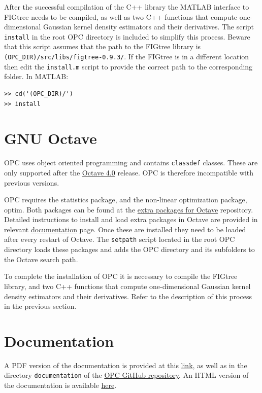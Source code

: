 \documentclass{book}
\begin{document}
After the successful compilation of the C++ library the MATLAB interface to
FIGtree needs to be compiled, as well as two C++ functions that compute
one-dimensional Gaussian kernel density estimators and their derivatives.
%
The script {\tt install} in the root OPC directory is included to simplify this process.
Beware that this script assumes that the path to the FIGtree library is
{\tt (OPC\_DIR)/src/libs/figtree-0.9.3/}. If the FIGtree is in a different location
then edit the {\tt install.m} script to provide the correct path to the corresponding folder.
%
In MATLAB:

\begin{lstlisting}
>> cd('(OPC_DIR)/')
>> install
\end{lstlisting}


\section{GNU Octave}\label{sec:Octave}

OPC uses object oriented programming and contains {\tt classdef}
classes. These are only supported after the
%
\href{https://octave.org/doc/v4.2.2/classdef-Classes.html#classdef-Classes}
{Octave 4.0}
%
release. OPC is therefore incompatible with previous versions.


OPC requires the statistics package, and the non-linear optimization package,
optim. 
%
Both packages can be found at the
\href{https://octave.sourceforge.io/packages.php}{extra packages for 
Octave} repository.
%
Detailed instructions to install and load extra packages in Octave are
provided in relevant
\href{https://octave.org/doc/interpreter/Packages.html#Packages}{documentation}
page.
%
Once these are installed they need to be loaded after every restart
of Octave. The {\tt setpath} script located in the root OPC directory loads
these packages and adds the OPC directory and its subfolders
to the Octave search path.

To complete the installation of OPC it is necessary to compile the FIGtree
library, and two C++ functions that compute one-dimensional Gaussian kernel
density estimators and their derivatives. Refer to the description of this
process in the previous section.



\section{Documentation}


A PDF version of the documentation  
is provided at this
%
\href{http://www.lancaster.ac.uk/staff/pavlidin/software/opc/documentation/document.pdf}{link},
%
as well as in the directory {\tt documentation} of the
%
\href{https://github.com/nicospavlidis/opc}
{OPC GitHub repository}.
%
%
An HTML version of the documentation is
available
%
\href{http://www.lancaster.ac.uk/staff/pavlidin/software/opc/documentation/document/onlinedoc.html}{here}.
%
\end{document}

